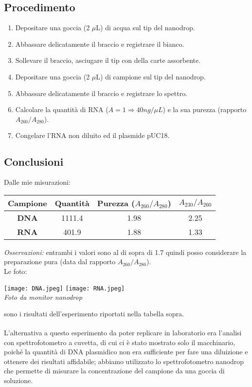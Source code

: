 \documentclass{extarticle}
\begin{document}
\subsection*{Procedimento}
\begin{enumerate}
    \item Depositare una goccia (2 $\mu$L) di acqua sul tip del nanodrop.
    \item Abbassare delicatamente il braccio e registrare il bianco.
    \item Sollevare il braccio, asciugare il tip con della carte assorbente.
    \item Depositare una goccia (2 $\mu$L) di campione sul tip del nanodrop.
    \item Abbassare delicatamente il braccio e registrare lo spettro.
    \item Calcolare la quantità di RNA ($ A = 1 \Rightarrow 40 ng / \mu L$) e la sua purezza (rapporto $A_{260} / A _{280}$).
    \item Congelare l'RNA non diluito ed il plasmide pUC18.
\end{enumerate}
\subsection*{Conclusioni} Dalle mie misurazioni:
\begin{center}
    \begin{tabular}{cccc}
    \toprule
    Campione & Quantità & Purezza ($A_{260} / A _{280}$) & $A_{230} / A _{260}$\\
    \midrule
    \textbf{DNA} & 1111.4 & 1.98 & 2.25\\
    \textbf{RNA} & 401.9& 1.88 & 1.33\\
    \bottomrule
    \end{tabular}
\end{center}
\textit{Osservazioni:} entrambi i valori sono al di sopra di 1.7 quindi posso considerare la preparazione pura (data dal rapporto $A_{260} / A _{280}$).\\
Le foto:
\begin{center}
\texttt{[image: DNA.jpeg]}
\texttt{[image: RNA.jpeg]}\\
\emph{Foto da monitor nanodrop}
\end{center}
sono i risultati dell'esperimento riportati nella tabella sopra.
\paragraph{}L'alternativa a questo esperimento da poter replicare in laboratorio era l'analisi con spettrofotometro a cuvetta, di cui ci è stato mostrato solo il macchinario, poiché la quantità di DNA plasmidico non era sufficiente per fare una diluizione e ottenere dei risultati affidabile; abbiamo utilizzato lo spettrofotometro nanodrop che permette di misurare la concentrazione del campione da una goccia di soluzione.
\end{document}
